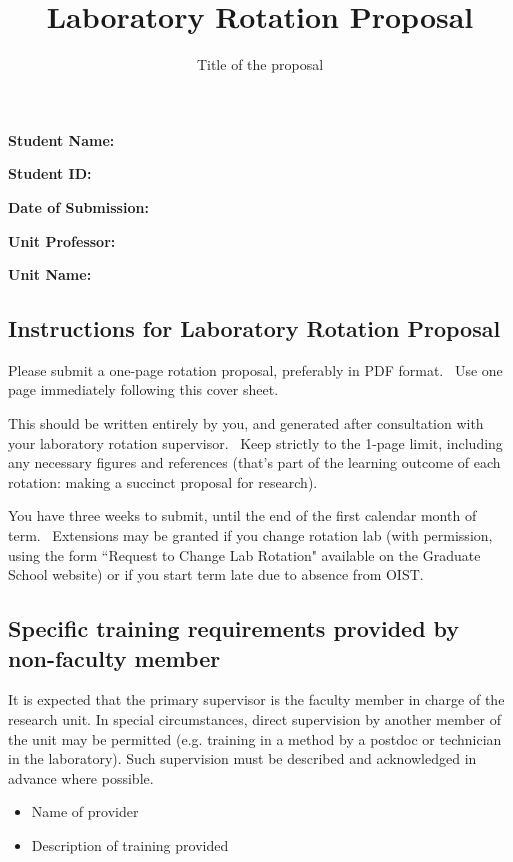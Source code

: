 \documentclass[fontsize=11pt, twocolumn]{scrartcl}	 %
\title{\vspace{-2.8cm}  \color{DarkRed} Laboratory Rotation Proposal}
\subtitle{Title of the proposal %
\vspace{-2cm} }
\date{} %
\begin{document}
\maketitle %
\thispagestyle{fancy} %

\textbf{Student Name:}  

\textbf{Student ID:} 

\textbf{Date of Submission:}

 \textbf{Unit Professor:} 

\textbf{Unit Name:} 	

\subsection*{Instructions for Laboratory Rotation Proposal}

Please submit a one-page rotation proposal, preferably in PDF format.  Use one page immediately following this cover sheet.

This should be written entirely by you, and generated after consultation with your laboratory rotation supervisor.  Keep strictly to the 1-page limit, including any necessary figures and references (that's part of the learning outcome of each rotation: making a succinct proposal for research).

You have three weeks to submit, until the end of the first calendar month of term.  Extensions may be granted if you change rotation lab (with permission, using the form ``Request to Change Lab Rotation" available on the Graduate School website) or if you start term late due to absence from OIST.

\vfill \break

\subsection*{Specific training requirements provided by non-faculty member}

It is expected that the primary supervisor is the faculty member in charge of the research unit. In special circumstances, direct supervision by another member of the unit may be permitted  (e.g. training in a method by a postdoc or technician in the laboratory).  Such supervision must be described and acknowledged in advance where possible.

\begin{itemize}
\item{Name of provider} 
\item{Description of training provided}
\end{itemize}
\end{document}
